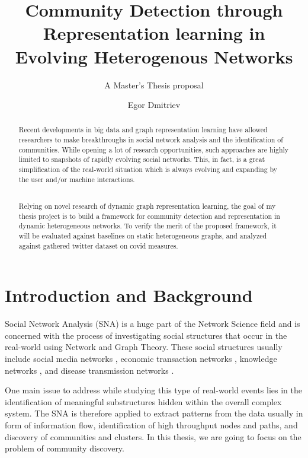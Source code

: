 \documentclass[
acmsmall,
nonacm,
screen,
acmthm]{acmart}
\title{Community Detection through Representation learning in Evolving
Heterogenous Networks}
\subtitle{A Master's Thesis proposal}
\author{Egor Dmitriev}
\affiliation{%
  \institution{Utrecht University}
  \country{The Netherlands}
}
\date{}
\begin{document}
\begin{abstract}
Recent developments in big data and graph representation learning have
allowed researchers to make breakthroughs in social network analysis and
the identification of communities. While opening a lot of research
opportunities, such approaches are highly limited to snapshots of
rapidly evolving social networks. This, in fact, is a great
simplification of the real-world situation which is always evolving and
expanding by the user and/or machine interactions.\\
\strut \\
Relying on novel research of dynamic graph representation learning, the
goal of my thesis project is to build a framework for community
detection and representation in dynamic heterogeneous networks. To
verify the merit of the proposed framework, it will be evaluated against
baselines on static heterogeneous graphs, and analyzed against gathered
twitter dataset on covid measures.
\end{abstract}
\maketitle



{
\setcounter{tocdepth}{2}
\tableofcontents
\pagebreak
}





\hypertarget{introduction-and-background}{%
\section{Introduction and
Background}\label{introduction-and-background}}

Social Network Analysis (SNA) is a huge part of the Network Science
field and is concerned with the process of investigating social
structures that occur in the real-world using Network and Graph Theory.
These social structures usually include social media networks
\citep{grandjeanSocialNetworkAnalysis2016, hagenCrisisCommunicationsAge2018},
economic transaction networks
\citep{prykeAnalysingConstructionProject2004, kongWhyAreSocial2011, swamynathanSocialNetworksImprove2008},
knowledge networks
\citep{gruberCollectiveKnowledgeSystems2008, brenneckeFirmKnowledgeNetwork2017},
and disease transmission networks
\citep{morrisNetworkEpidemiologyHandbook2004, stattnerSocialNetworkAnalysis2011}.

One main issue to address while studying this type of real-world events
lies in the identification of meaningful substructures hidden within the
overall complex system. The SNA is therefore applied to extract patterns
from the data usually in form of information flow, identification of
high throughput nodes and paths, and discovery of communities and
clusters. In this thesis, we are going to focus on the problem of
community discovery.
\end{document}
